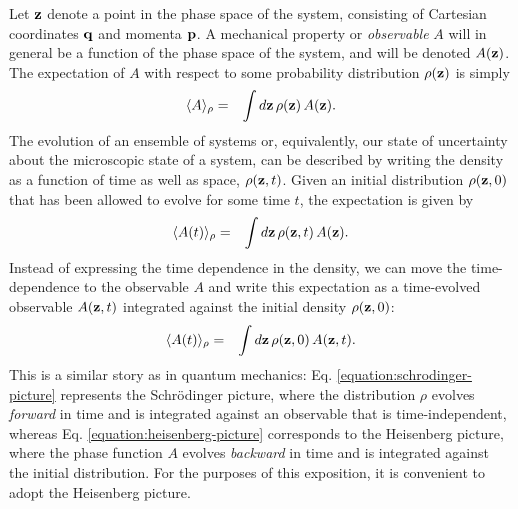 Let ${\bf z}$ denote a point in the phase space of the system, consisting of Cartesian coordinates ${\bf q}$ and momenta ${\bf p}$. 
A mechanical property or \emph{observable} $A$ will in general be a function of the phase space of the system, and will be denoted $A({\bf z})$.  
The expectation of $A$ with respect to some probability distribution $\rho({\bf z})$ is simply
\begin{eqnarray}
\langle A \rangle_\rho &=& \int d{\bf z} \, \rho({\bf z}) \, A({\bf z}).
\end{eqnarray}
The evolution of an ensemble of systems or, equivalently, our state of uncertainty about the microscopic state of a system, can be described by writing the density as a function of time as well as space, $\rho({\bf z},t)$.  Given an initial distribution $\rho({\bf z},0)$ that has been allowed to evolve for some time $t$, the expectation is given by
\begin{eqnarray}
\langle A(t) \rangle_\rho &=& \int d{\bf z} \, \rho({\bf z},t) \, A({\bf z}). \label{equation:schrodinger-picture}
\end{eqnarray}
Instead of expressing the time dependence in the density, we can move the time-dependence to the observable $A$ and write this expectation as a time-evolved observable $A({\bf z},t)$ integrated against the initial density $\rho({\bf z},0)$:
\begin{eqnarray}
\langle A(t) \rangle_\rho &=& \int d{\bf z} \, \rho({\bf z},0) \, A({\bf z}, t). \label{equation:heisenberg-picture}
\end{eqnarray}
This is a similar story as in quantum mechanics: Eq. \ref{equation:schrodinger-picture} represents the Schr\"{o}dinger picture, where the distribution $\rho$ evolves \emph{forward} in time and is integrated against an observable that is time-independent, whereas Eq. \ref{equation:heisenberg-picture} corresponds to the Heisenberg picture, where the phase function $A$ evolves \emph{backward} in time and is integrated against the initial distribution.  
For the purposes of this exposition, it is convenient to adopt the Heisenberg picture.

